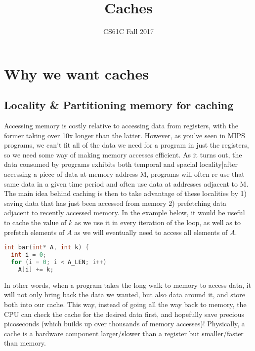 \documentclass{article}
\title{Caches}
\author{CS61C Fall 2017}
\date{ }
\begin{document}
\maketitle
\tableofcontents
\newpage

\section{Why we want caches}
\subsection{Locality \& Partitioning memory for caching}
Accessing memory is costly relative to accessing data from registers, with the former taking over 10x longer than the latter. However, as you've seen in MIPS programs, we can't fit all of the data we need for a program in just the registers, so we need some way of making memory accesses efficient. As it turns out, the data consumed by programs exhibits both temporal and spacial locality|after accessing a piece of data at memory address M, programs will often re-use that same data in a given time period and often use data at addresses adjacent to M.  The main idea behind caching is then to take advantage of these localities by 1) saving data that has just been accessed from memory 2) prefetching data adjacent to recently accessed memory. In the example below, it would be useful to cache the value of $k$ as we use it in every iteration of the loop, as well as to prefetch elements of $A$ as we will eventually need to access all elements of $A$.

\begin{center}
\renewcommand{\ttdefault}{pcr}
\begin{lstlisting}[language=C, basicstyle=\ttfamily,  keywordstyle=\bfseries, showstringspaces=false]
int bar(int* A, int k) {
  int i = 0;
  for (i = 0; i < A_LEN; i++)
    A[i] += k;

\end{lstlisting}
\end{center}

In other words, when a program takes the long walk to memory to access data, it will not only bring back the data we wanted, but also data around it, and store both into our cache. This way, instead of going all the way back to memory, the CPU can check the cache for the desired data first, and hopefully save precious picoseconds (which builds up over thousands of memory accesses)! Physically, a cache is a hardware component larger/slower than a register but smaller/faster than memory. 
\end{document}
